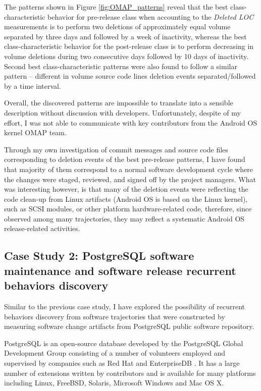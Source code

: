 The patterns shown in Figure \ref{fig:OMAP_patterns} reveal that the best class-characteristic behavior for pre-release class when accounting to the \textit{Deleted LOC} measurements is to perform two deletions of approximately equal volume separated by three days and followed by a week of inactivity, whereas the best class-characteristic behavior for the post-release class is to perform decreasing in volume deletions during two consecutive days followed by 10 days of inactivity. Second best class-characteristic patterns were also found to follow a similar pattern -- different in volume source code lines deletion events separated/followed by a time interval.

Overall, the discovered patterns are impossible to translate into a sensible description without discussion with developers. Unfortunately, despite of my effort, I was not able to communicate with key contributors from the Android OS kernel OMAP team. 

Through my own investigation of commit messages and source code files corresponding to deletion events of the best pre-release patterns, I have found that majority of them correspond to a normal software development cycle where the changes were staged, reviewed, and signed off by the project managers. What was interesting however, is that many of the deletion events were reflecting the code clean-up from Linux artifacts (Android OS is based on the Linux kernel), such as SCSI modules, or other platform hardware-related code, therefore, since observed among many trajectories, they may reflect a systematic Android OS release-related activities.

\clearpage

\subsection{Case Study 2: PostgreSQL software maintenance and software release recurrent behaviors discovery}\label{case2}
Similar to the previous case study, I have explored the possibility of recurrent behaviors discovery from software trajectories that were constructed by measuring software change artifacts from PostgreSQL public software repository. 
 
PostgreSQL is an open-source database developed by the PostgreSQL Global Development Group consisting of a number of volunteers employed and supervised by companies such as Red Hat and EnterpriseDB \cite{postgre-contrib}. It has a large number of extensions written by contributors and is available for many platforms including Linux, FreeBSD, Solaris, Microsoft Windows and Mac OS X.

